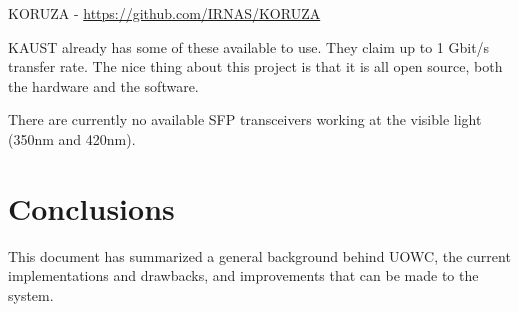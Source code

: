 \documentclass{article}
\begin{document}
KORUZA - \url{https://github.com/IRNAS/KORUZA}

KAUST already has some of these available to use. They claim up to 1 Gbit/s
transfer rate. The nice thing about this project is that it is all open source,
both the hardware and the software.

There are currently no available \ac{SFP} transceivers working at the visible
light (350nm and 420nm).

\section{Conclusions}
This document has summarized a general background behind \ac{UOWC}, the current
implementations and drawbacks, and improvements that can be made to the system.





\end{document}
